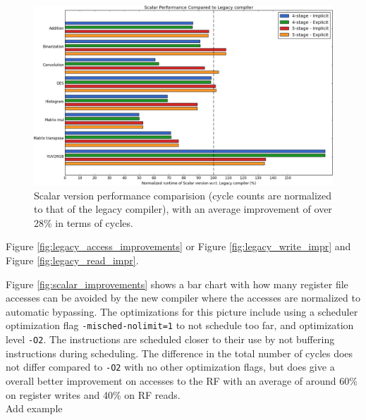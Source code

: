 \begin{figure}[t!]
\centering
\hspace*{-.12in}
\includegraphics[width=\textwidth]{figures/stats/scalar_cycles}
\caption{Scalar version performance comparision (cycle counts are normalized to that of the legacy compiler), with an average improvement of over 28\% in terms of cycles.}
\label{fig:legacy_scalar_cmp}
\end{figure}


Figure \ref{fig:legacy_access_improvements} or Figure \ref{fig:legacy_write_impr} and Figure \ref{fig:legacy_read_impr}.


Figure \ref{fig:scalar_improvements} shows a bar chart with how many register file accesses can be avoided by the new compiler where the accesses are normalized to automatic bypassing. The optimizations for this picture include using a scheduler optimization flag \texttt{-misched-nolimit=1} to not schedule too far, and optimization level \texttt{-O2}. The instructions are scheduled closer to their use by not buffering instructions during scheduling. The difference in the total number of cycles does not differ compared to \texttt{-O2} with no other optimization flags, but does give a overall better improvement on accesses to the RF with an average of around 60\% on register writes and 40\% on RF reads.\\

Add example \\ %



